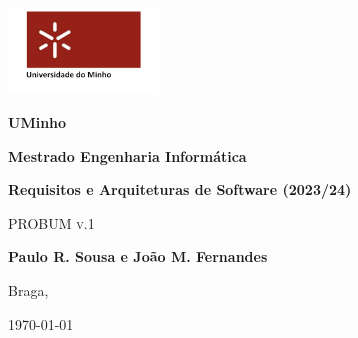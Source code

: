 \begin{titlepage}
	\centering
	\includegraphics[width=0.3\textwidth]{imagens/capa/uminho.png}\par\vspace{1cm}
	{\huge\bf UMinho\par}
	\vspace{0.5cm}
	{\huge\bf Mestrado Engenharia Informática\par}
	\vspace{0.1cm}
	{\huge\bf Requisitos e Arquiteturas de Software (2023/24)\par}
	\vspace{3cm}
    {\scshape\LARGE  \par}
    \vspace{0.5cm}
    {\scshape\Huge  PROBUM v.1\par}
    
    \vspace{2.5cm}
    
    \textbf{Paulo R. Sousa e João M. Fernandes}
    
    \vspace{5.5cm}
    
    \large Braga, {\large \today\par}

 \end{titlepage}

